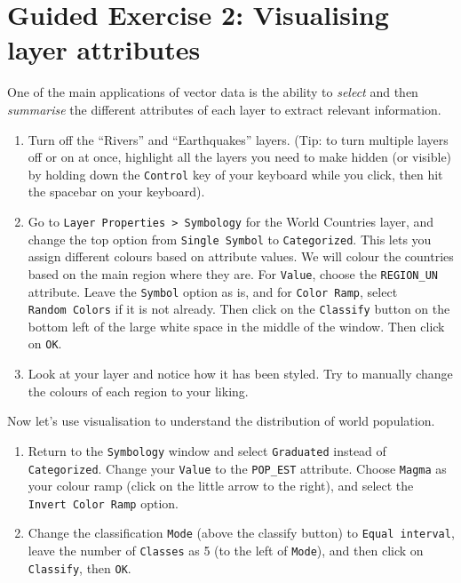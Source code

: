 \documentclass[
  letterpaper,
  DIV=11,
  numbers=noendperiod]{scrreprt}
\begin{document}
\section{Guided Exercise 2: Visualising layer
attributes}\label{guided-exercise-2-visualising-layer-attributes}

One of the main applications of vector data is the ability to
\emph{select} and then \emph{summarise} the different attributes of each
layer to extract relevant information.

\begin{enumerate}
\def\labelenumi{(\arabic{enumi})}
\setcounter{enumi}{70}
\item
  Turn off the ``Rivers'' and ``Earthquakes'' layers. (Tip: to turn
  multiple layers off or on at once, highlight all the layers you need
  to make hidden (or visible) by holding down the \texttt{Control} key
  of your keyboard while you click, then hit the spacebar on your
  keyboard).
\item
  Go to \texttt{Layer\ Properties\ \textgreater{}\ Symbology} for the
  World Countries layer, and change the top option from
  \texttt{Single\ Symbol} to \texttt{Categorized}. This lets you assign
  different colours based on attribute values. We will colour the
  countries based on the main region where they are. For \texttt{Value},
  choose the \texttt{REGION\_UN} attribute. Leave the \texttt{Symbol}
  option as is, and for \texttt{Color\ Ramp}, select
  \texttt{Random\ Colors} if it is not already. Then click on the
  \texttt{Classify} button on the bottom left of the large white space
  in the middle of the window. Then click on \texttt{OK}.
\item
  Look at your layer and notice how it has been styled. Try to manually
  change the colours of each region to your liking.
\end{enumerate}

Now let's use visualisation to understand the distribution of world
population.

\begin{enumerate}
\def\labelenumi{(\arabic{enumi})}
\setcounter{enumi}{73}
\item
  Return to the \texttt{Symbology} window and select \texttt{Graduated}
  instead of \texttt{Categorized}. Change your \texttt{Value} to the
  \texttt{POP\_EST} attribute. Choose \texttt{Magma} as your colour ramp
  (click on the little arrow to the right), and select the
  \texttt{Invert\ Color\ Ramp} option.
\item
  Change the classification \texttt{Mode} (above the classify button) to
  \texttt{Equal\ interval}, leave the number of \texttt{Classes} as 5
  (to the left of \texttt{Mode}), and then click on \texttt{Classify},
  then \texttt{OK}.
\end{enumerate}
\end{document}
